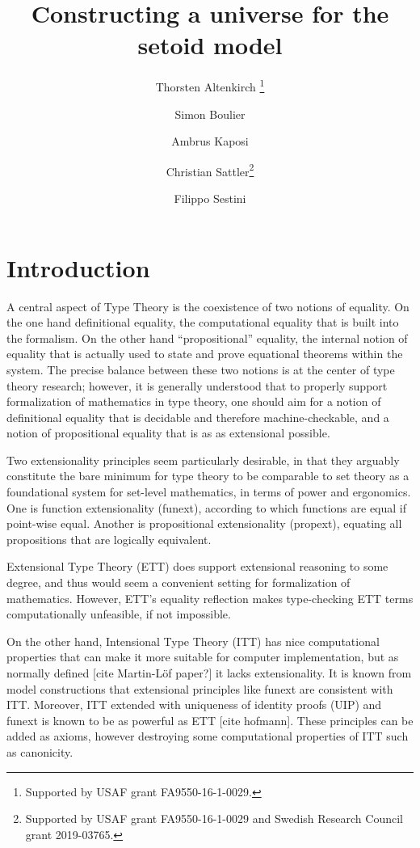 \documentclass{easychair}
\title{Constructing a universe for the setoid model}
\author{
  Thorsten Altenkirch \inst{1}\thanks{Supported by USAF grant FA9550-16-1-0029.}
\and
  Simon Boulier
\and
  Ambrus Kaposi \inst{2}
\and
  Christian Sattler\inst{3}\thanks{Supported by USAF grant FA9550-16-1-0029 and Swedish Research Council grant 2019-03765.}
\and
  Filippo Sestini\inst{1}
}
\institute{
  School of Computer Science, University of Nottingham, UK\\
  \email{\{psztxa,pszcs1,psxfs5\}@nottingham.ac.uk}
  \and
  E{\"o}tv{\"o}s Lor{\'a}nd University, Budapest, Hungary\\
  \email{akaposi@inf.elte.hu}
  \and
  Chalmers University of Technology, Gothenburg, Sweden
  \email{sattler@chalmers.se}
}
\begin{document}
\maketitle

\section{Introduction}

A central aspect of Type Theory is the coexistence of two notions of
equality. On the one hand definitional equality, the computational equality that
is built into the formalism. On the other hand ``propositional'' equality, the
internal notion of equality that is actually used to state and prove equational
theorems within the system. The precise balance between these two notions is at
the center of type theory research; however, it is generally understood that to
properly support formalization of mathematics in type theory, one should aim for
a notion of definitional equality that is decidable and therefore
machine-checkable, and a notion of propositional equality that is as as
extensional possible.

Two extensionality principles seem particularly desirable, in that they arguably
constitute the bare minimum for type theory to be comparable to set theory as a
foundational system for set-level mathematics, in terms of power and ergonomics.
One is function extensionality (funext), according to which functions are equal
if point-wise equal. Another is propositional extensionality (propext), equating
all propositions that are logically equivalent.

Extensional Type Theory (ETT) does support extensional reasoning to some degree,
and thus would seem a convenient setting for formalization of
mathematics. However, ETT's equality reflection makes type-checking ETT terms
computationally unfeasible, if not impossible.

On the other hand, Intensional Type Theory (ITT) has nice computational
properties that can make it more suitable for computer implementation, but as
normally defined [cite Martin-L\"of paper?] it lacks extensionality.
%
It is known from model constructions that extensional principles like funext are
consistent with ITT.
%
Moreover, ITT extended with uniqueness of identity proofs (UIP) and funext is
known to be as powerful as ETT [cite hofmann]. These principles can be added as
axioms, however destroying some computational properties of ITT such as
canonicity.
\end{document}
